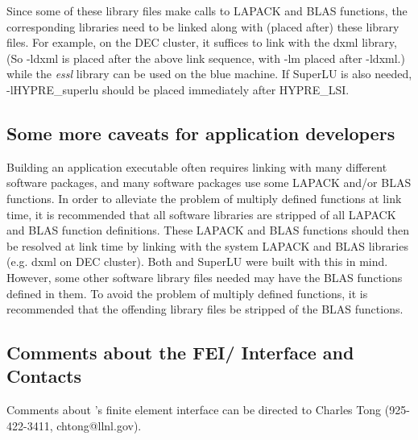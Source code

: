 Since some of these library files make calls to LAPACK and BLAS functions, 
the corresponding libraries need to be linked along with (placed after) these 
library files.  For example, on the DEC cluster, it suffices to link
with the {\sf dxml} library, (So {\sf -ldxml} is placed after the above link
sequence, with {\sf -lm} placed after {\sf -ldxml}.) while the {\it essl}
library can be used on the blue machine. If {\sf SuperLU} is also needed,
{\sf -lHYPRE\_superlu} should be placed immediately after {\sf HYPRE\_LSI}.

\subsection{Some more caveats for application developers}

Building an application executable often requires linking with many different
software packages, and many software packages use some LAPACK and/or BLAS
functions.  In order to alleviate the problem of multiply defined functions
at link time, it is recommended that all software libraries are stripped of
all LAPACK and BLAS function definitions.  These LAPACK and BLAS functions 
should then be resolved at link time by linking with the system LAPACK and
BLAS libraries (e.g. dxml on DEC cluster).  Both \hypre{} and SuperLU were
built with this in mind.  However, some other software library files needed
may have the BLAS functions defined in them.  To avoid the problem of
multiply defined functions, it is recommended that the offending library
files be stripped of the BLAS functions.

\subsection{Comments about the FEI/\hypre{} Interface and Contacts}

Comments about \hypre{}'s finite element interface can be directed
to Charles Tong (925-422-3411, chtong@llnl.gov).



